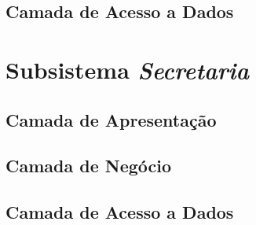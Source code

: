 

\subsection{Camada de Acesso a Dados}
\label{subsec-arquitetura-dados-nucleo}



\section{Subsistema \textit{Secretaria}}
\subsection{Camada de Apresentação}
\label{subsec-arquitetura-apresentacao-secretaria}


\subsection{Camada de Negócio}
\label{subsec-arquitetura-negocio-nucleo-secretaria}


\subsection{Camada de Acesso a Dados}
\label{subsec-arquitetura-dados-nucleo-secretaria}


